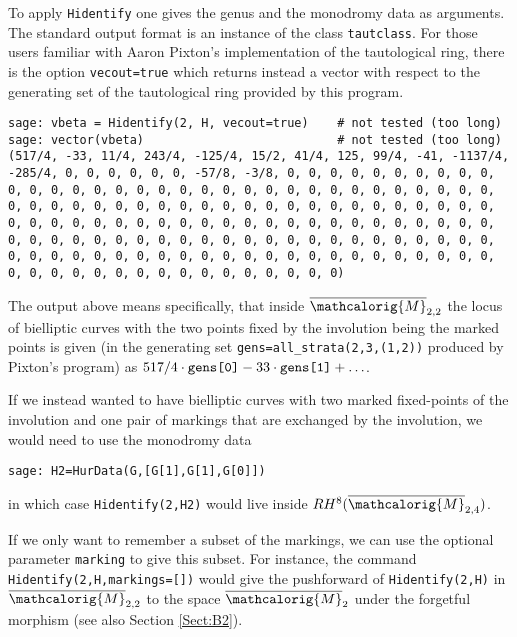\documentclass[11pt]{article}
\newcommand{\M}{\ensuremath{\overline{\mathcalorig{M}}}}
\begin{document}
To apply \verb|Hidentify| one gives the genus and the monodromy data as arguments.
The standard output format is an instance of the class \verb|tautclass|. For those users familiar with Aaron Pixton's implementation of the tautological ring, there is the option \verb|vecout=true| which returns instead a vector with respect to the generating set of the tautological ring provided by this program.
\begin{lstlisting}
sage: vbeta = Hidentify(2, H, vecout=true)    # not tested (too long)
sage: vector(vbeta)                           # not tested (too long)
(517/4, -33, 11/4, 243/4, -125/4, 15/2, 41/4, 125, 99/4, -41, -1137/4, -285/4, 0, 0, 0, 0, 0, 0, -57/8, -3/8, 0, 0, 0, 0, 0, 0, 0, 0, 0, 0, 0, 0, 0, 0, 0, 0, 0, 0, 0, 0, 0, 0, 0, 0, 0, 0, 0, 0, 0, 0, 0, 0, 0, 0, 0, 0, 0, 0, 0, 0, 0, 0, 0, 0, 0, 0, 0, 0, 0, 0, 0, 0, 0, 0, 0, 0, 0, 0, 0, 0, 0, 0, 0, 0, 0, 0, 0, 0, 0, 0, 0, 0, 0, 0, 0, 0, 0, 0, 0, 0, 0, 0, 0, 0, 0, 0, 0, 0, 0, 0, 0, 0, 0, 0, 0, 0, 0, 0, 0, 0, 0, 0, 0, 0, 0, 0, 0, 0, 0, 0, 0, 0, 0, 0, 0, 0, 0, 0, 0, 0, 0, 0, 0, 0, 0, 0, 0, 0, 0, 0, 0, 0, 0, 0, 0, 0, 0, 0, 0, 0, 0)
\end{lstlisting}
The output above means specifically, that inside $\M_{2,2}$ the locus of bielliptic curves with the two points fixed by the involution being the marked points is given (in the generating set \verb|gens=all_strata(2,3,(1,2))| produced by Pixton's program) as $517/4 \cdot \verb|gens[0]| - 33 \cdot \verb|gens[1]| + \ldots$.

If we instead wanted to have bielliptic curves with two marked fixed-points of the involution and one pair of markings that are exchanged by the involution, we would need to use the monodromy data
\begin{lstlisting}
sage: H2=HurData(G,[G[1],G[1],G[0]])
\end{lstlisting}
in which case \verb|Hidentify(2,H2)| would live inside $RH^{8}(\M_{2,4})$.

If we only want to remember a subset of the markings, we can use the optional parameter \verb|marking| to give this subset. For instance, the command \verb|Hidentify(2,H,markings=[])| would give the pushforward of \verb|Hidentify(2,H)| in $\M_{2,2}$ to the space $\M_2$ under the forgetful morphism (see also Section \ref{Sect:B2}).

\end{document}
